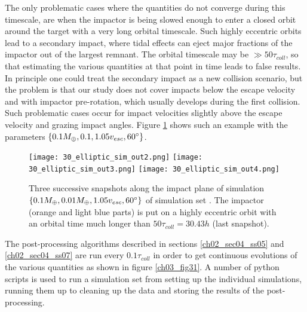 The only problematic cases where the quantities do not converge during this timescale, are when the impactor is being slowed enough to enter a closed orbit around the target with a very long orbital timescale. Such highly eccentric orbits lead to a secondary impact, where tidal effects can eject major fractions of the impactor out of the largest remnant. The orbital timescale may be $\gg 50 \tau_{coll}$, so that estimating the various quantities at that point in time leads to false results. In principle one could treat the secondary impact as a new collision scenario, but the problem is that our study does not cover impacts below the escape velocity and with impactor pre-rotation, which usually develops during the first collision. Such problematic cases occur for impact velocities slightly above the escape velocity and grazing impact angles. Figure \ref{ch03_fig30} shows such an example with the parameters $\{0.1 M_{\oplus}, 0.1, 1.05 v_{esc}, 60 ^\circ \}$.
\begin{figure}
\begin{center}
\texttt{[image: 30\_elliptic\_sim\_out2.png]}
\texttt{[image: 30\_elliptic\_sim\_out3.png]}
\texttt{[image: 30\_elliptic\_sim\_out4.png]}
\caption{Three successive snapshots along the impact plane of simulation $\{0.1 M_{\oplus}, 0.01 M_{\oplus}, 1.05 v_{esc}, 60 ^\circ \}$ of simulation set \css. The impactor (orange and light blue parts) is put on a highly eccentric orbit with an orbital time much longer than $50 \tau_{coll} = 30.43h$ (last snapshot).}
\label{ch03_fig30}
\end{center}
\end{figure}

The post-processing algorithms described in sections \ref{ch02_sec04_ss05} and \ref{ch02_sec04_ss07} are run every $0.1 \tau_{coll}$ in order to get continuous evolutions of the various quantities as shown in figure \ref{ch03_fig31}. A number of python scripts is used to run a simulation set from setting up the individual simulations, running them up to cleaning up the data and storing the results of the post-processing.


